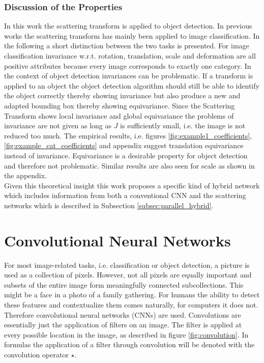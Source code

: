 \subsubsection{Discussion of the Properties}

In this work the scattering transform is applied to object detection. In previous works the scattering transform has mainly been applied to image classification. In the following a short distinction between the two tasks is presented. For image classification invariance w.r.t. rotation, translation, scale and deformation are all positive attributes because every image corresponds to exactly one category. In the context of object detection invariances can be problematic. If a transform is applied to an object the object detection algorithm should still be able to identify the object correctly thereby showing invariance but also produce a new and adapted bounding box thereby showing equivariance. Since the Scattering Transform shows local invariance and global equivariance the problems of invariance are not given as long as $J$ is sufficiently small, i.e. the image is not reduced too much. The empirical results, i.e. figures \ref{fig:example1_coefficients}, \ref{fig:example_cat_coefficients} and appendix suggest translation equivariance instead of invariance. Equivariance is a desirable property for object detection and therefore not problematic. Similar results are also seen for scale as shown in the appendix. \\
Given this theoretical insight this work proposes a specific kind of hybrid network which includes information from both a conventional CNN and the scattering networks which is described in Subsection \ref{subsec:parallel_hybrid}. 

     
 \section{Convolutional Neural Networks}
 \label{sec:cnns}
 
 For most image-related tasks, i.e. classification or object detection, a picture is used as a collection of pixels. However, not all pixels are equally important and subsets of the entire image form meaningfully connected subcollections. This might be a face in a photo of a family gathering. For humans the ability to detect these features and contextualize them comes naturally, for computers it does not. Therefore convolutional neural networks (CNNs) \cite{LeCun1989BackpropagationAT} are used. Convolutions are essentially just the application of filters on an image. The filter is applied at every possible location in the image, as described in figure \ref{fig:convolution}. In formulas the application of a filter through convolution will be denoted with the convolution operator $\star$.
 
